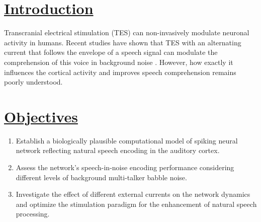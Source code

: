 \documentclass[a0,portrait]{a0poster}
\newenvironment{nenumerate}{%
  \begin{enumerate}[topsep=6pt,itemsep=2pt,parsep=0pt,label=\textbf{\arabic*. }]%
}{%
  \end{enumerate}%
}
\begin{document}
\begin{multicols*}{2} %

\section*{\underline{Introduction}}
\begin{flushleft}
\normalsize
Transcranial electrical stimulation (TES) can non-invasively modulate neuronal activity in humans. Recent studies have shown that TES with an alternating current that follows the envelope of a speech signal can modulate the comprehension of this voice in background noise \cite{Wilsch2018TranscranialComprehension}. However, how exactly it influences the cortical activity and improves speech comprehension remains poorly understood.
\end{flushleft}


\section*{\underline{Objectives}}
\begin{flushleft}
\normalsize
\begin{nenumerate}
\item Establish a biologically plausible computational model of spiking neural network reflecting natural speech encoding in the auditory cortex.
\item Assess the network's speech-in-noise encoding performance considering different levels of background multi-talker babble noise.
\item Investigate the effect of different external currents on the network dynamics and optimize the stimulation paradigm for the enhancement of natural speech processing.
\end{nenumerate}
\end{flushleft}



\end{multicols*}
\end{document}
